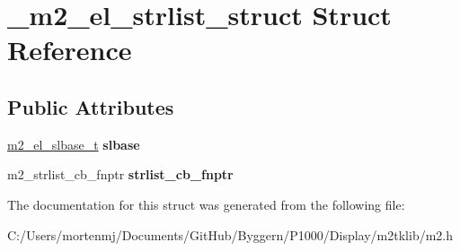 \hypertarget{struct__m2__el__strlist__struct}{\section{\-\_\-m2\-\_\-el\-\_\-strlist\-\_\-struct Struct Reference}
\label{struct__m2__el__strlist__struct}
}
\subsection*{Public Attributes}
\begin{DoxyCompactItemize}
\item 
\hypertarget{struct__m2__el__strlist__struct_a4739c2cc5aaa0718d591e525a8ef7b02}{\hyperlink{struct__m2__el__slbase__struct}{m2\-\_\-el\-\_\-slbase\-\_\-t} {\bfseries slbase}}\label{struct__m2__el__strlist__struct_a4739c2cc5aaa0718d591e525a8ef7b02}

\item 
\hypertarget{struct__m2__el__strlist__struct_a08a43b5b67bccb8f231cc9d8a152db3f}{m2\-\_\-strlist\-\_\-cb\-\_\-fnptr {\bfseries strlist\-\_\-cb\-\_\-fnptr}}\label{struct__m2__el__strlist__struct_a08a43b5b67bccb8f231cc9d8a152db3f}

\end{DoxyCompactItemize}


The documentation for this struct was generated from the following file\-:\begin{DoxyCompactItemize}
\item 
C\-:/\-Users/mortenmj/\-Documents/\-Git\-Hub/\-Byggern/\-P1000/\-Display/m2tklib/m2.\-h\end{DoxyCompactItemize}
